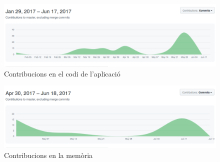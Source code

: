 \begin{figure}[H]
\includegraphics[scale=0.375]{Figures/commits_android.png}
\caption{Contribucions en el codi de l'aplicació}
\end{figure}
\begin{figure}[H]
\includegraphics[scale=0.375]{Figures/commits_reports.png}
\caption{Contribucions en la memòria}
\end{figure}
